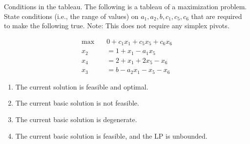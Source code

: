\begin{ex}
{Conditions in the tableau.} The following is a tableau of a maximization problem. State conditions (i.e., the range of values) on $a_{1}, a_{2}, b, c_{1}, c_{5}, c_{6}$ that are required to make the following true.  Note: This does not require any simplex pivots.
\begin{center}
\begin{align*}
\max \quad &0 + c_1 x_1 + c_5 x_5 + c_6 x_6 \\
x_2 &= 1 + x_1 - a_1 x_5 \\
x_4 &= 2 + x_1 + 2x_5 - x_6 \\
x_3 &= b - a_2 x_1 - x_5 - x_6
\end{align*}
\end{center}

\begin{enumerate}
\item  The current solution is feasible and optimal.
\item The current basic solution is not feasible.
\item  The current basic solution is degenerate.
\item  The current basic solution is feasible, and the LP is unbounded.
\end{enumerate}

\end{ex}

